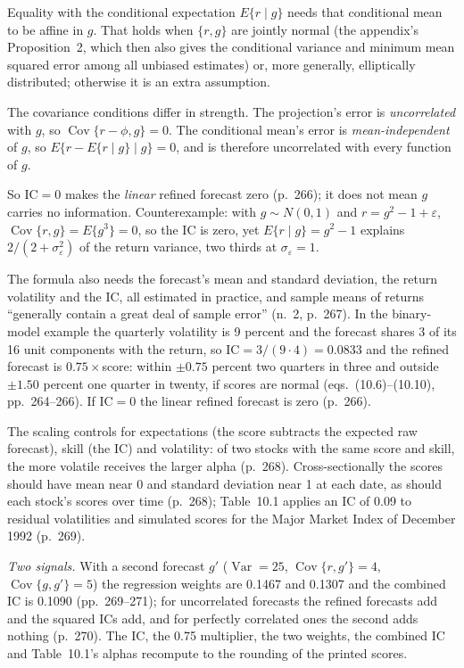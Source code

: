 \begin{qfmethod}[Scaling a raw signal into a return forecast: alpha $=$ volatility $\times$ IC $\times$ score, and combining two correlated signals]
Equality with the conditional expectation $E\{r\mid g\}$ needs that conditional mean to be affine in $g$. That holds when $\{r,g\}$ are jointly normal (the appendix's Proposition~2, which then also gives the conditional variance and minimum mean squared error among all unbiased estimates) or, more generally, elliptically distributed; otherwise it is an extra assumption.

The covariance conditions differ in strength. The projection's error is \emph{uncorrelated} with $g$, so $\operatorname{Cov}\{r-\phi,g\}=0$. The conditional mean's error is \emph{mean-independent} of $g$, so $E\{r-E\{r\mid g\}\mid g\}=0$, and is therefore uncorrelated with every function of $g$.

So $\mathrm{IC}=0$ makes the \emph{linear} refined forecast zero (p.~266); it does not mean $g$ carries no information. Counterexample: with $g\sim N(0,1)$ and $r=g^2-1+\varepsilon$, $\operatorname{Cov}\{r,g\}=E\{g^3\}=0$, so the IC is zero, yet $E\{r\mid g\}=g^2-1$ explains $2/(2+\sigma_\varepsilon^2)$ of the return variance, two thirds at $\sigma_\varepsilon=1$.

The formula also needs the forecast's mean and standard deviation, the return volatility and the IC, all estimated in practice, and sample means of returns ``generally contain a great deal of sample error'' (n.~2, p.~267). In the binary-model example the quarterly volatility is 9 percent and the forecast shares 3 of its 16 unit components with the return, so $\mathrm{IC}=3/(9\cdot4)=0.0833$ and the refined forecast is $0.75\times$score: within $\pm0.75$ percent two quarters in three and outside $\pm1.50$ percent one quarter in twenty, if scores are normal (eqs.~(10.6)--(10.10), pp.~264--266). If $\mathrm{IC}=0$ the linear refined forecast is zero (p.~266).

 The scaling controls for expectations (the score subtracts the expected raw forecast), skill (the IC) and volatility: of two stocks with the same score and skill, the more volatile receives the larger alpha (p.~268). Cross-sectionally the scores should have mean near 0 and standard deviation near 1 at each date, as should each stock's scores over time (p.~268); Table~10.1 applies an IC of 0.09 to residual volatilities and simulated scores for the Major Market Index of December 1992 (p.~269).

\emph{Two signals.} With a second forecast $g'$ ($\operatorname{Var}=25$, $\operatorname{Cov}\{r,g'\}=4$, $\operatorname{Cov}\{g,g'\}=5$) the regression weights are 0.1467 and 0.1307 and the combined IC is 0.1090 (pp.~269--271); for uncorrelated forecasts the refined forecasts add and the squared ICs add, and for perfectly correlated ones the second adds nothing (p.~270). The IC, the 0.75 multiplier, the two weights, the combined IC and Table~10.1's alphas recompute to the rounding of the printed scores.


\end{qfmethod}
